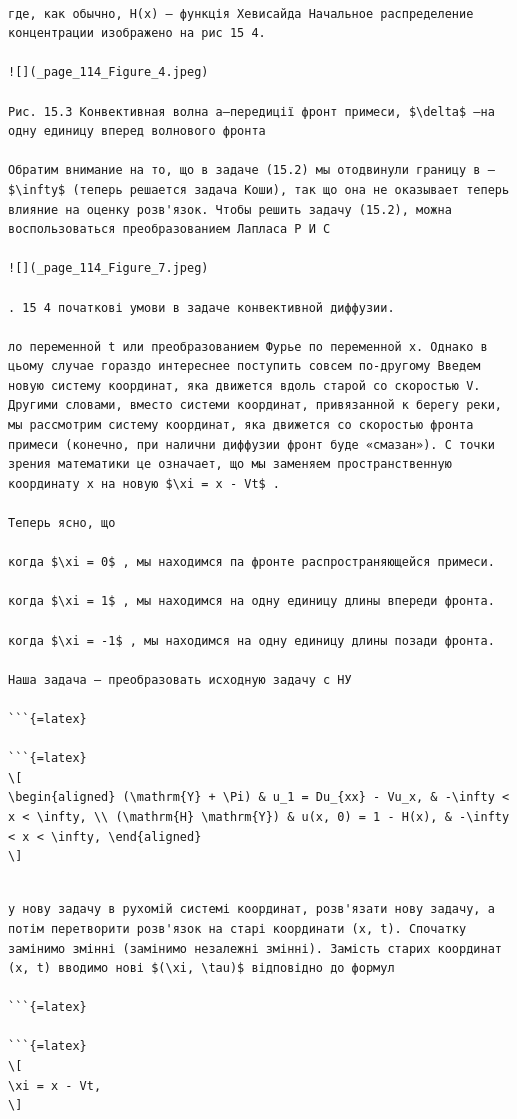 \documentclass[
]{article}
\begin{document}
\begin{verbatim}

где, как обычно, H(x) — функція Хевисайда Начальное распределение концентрации изображено на рис 15 4.

![](_page_114_Figure_4.jpeg)

Рис. 15.3 Конвективная волна a—передиції фронт примеси, $\delta$ —на одну единицу вперед волнового фронта

Обратим внимание на то, що в задаче (15.2) мы отодвинули границу в — $\infty$ (теперь решается задача Коши), так що она не оказывает теперь влияние на оценку розв'язок. Чтобы решить задачу (15.2), можна воспользоваться преобразованием Лапласа Р И С

![](_page_114_Figure_7.jpeg)

. 15 4 початкові умови в задаче конвективной диффузии.

ло переменной t или преобразованием Фурье по переменной x. Однако в цьому случае гораздо интереснее поступить совсем по-другому Введем новую систему координат, яка движется вдоль старой со скоростью V. Другими словами, вместо системи координат, привязанной к берегу реки, мы рассмотрим систему координат, яка движется со скоростью фронта примеси (конечно, при налични диффузии фронт буде «смазан»). С точки зрения математики це означает, що мы заменяем пространственную координату x на новую $\xi = x - Vt$ .

Теперь ясно, що

когда $\xi = 0$ , мы находимся па фронте распространяющейся примеси.

когда $\xi = 1$ , мы находимся на одну единицу длины впереди фронта.

когда $\xi = -1$ , мы находимся на одну единицу длины позади фронта.

Наша задача — преобразовать исходную задачу с НУ

```{=latex}

```{=latex}
\[
\begin{aligned} (\mathrm{Y} + \Pi) & u_1 = Du_{xx} - Vu_x, & -\infty < x < \infty, \\ (\mathrm{H} \mathrm{Y}) & u(x, 0) = 1 - H(x), & -\infty < x < \infty, \end{aligned}
\]
\end{verbatim}

\begin{verbatim}

у нову задачу в рухомій системі координат, розв'язати нову задачу, а потім перетворити розв'язок на старі координати (x, t). Спочатку замінимо змінні (замінимо незалежні змінні). Замість старих координат (x, t) вводимо нові $(\xi, \tau)$ відповідно до формул

```{=latex}

```{=latex}
\[
\xi = x - Vt,
\]
\end{verbatim}
\end{document}
